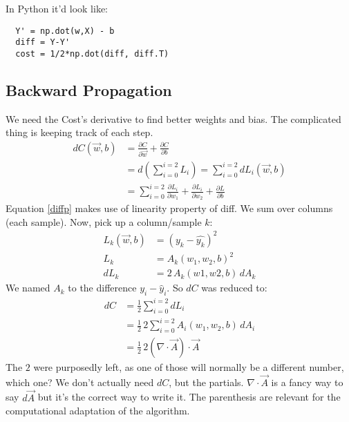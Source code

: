In Python it'd look like:
\begin{center}
  \begin{BVerbatim}
  Y' = np.dot(w,X) - b
  diff = Y-Y' 
  cost = 1/2*np.dot(diff, diff.T)
  \end{BVerbatim}
\end{center}





\subsection{Backward Propagation}
We need the Cost's derivative to find better weights and bias. The complicated thing is keeping track of each step.
\begin{align}
  dC(\vec{w},b) &= \frac{\partial C}{\partial \vec{w}} + \frac{\partial C}{\partial b}\nonumber\\
  &= d(\sum_{i=0}^{i=2}L_i) = \sum_{i=0}^{i=2}dL_i(\vec{w},b) \label{diffp}\\
  &=\sum_{i=0}^{i=2} \frac{\partial L_i}{\partial w_1} +\frac{\partial L_i}{\partial w_2} + \frac{\partial L}{\partial b}\nonumber
\end{align}
Equation \ref{diffp} makes use of linearity property of diff. We sum over columns (each sample). Now, pick up a column/sample $k$:
\begin{align*}
  L_k(\vec{w},b) &= (y_k - \hat{y_k})^2\\
    L_k &= A_k(w_1, w_2, b)^2\\
    dL_k &= 2\,A_k(w1,w2,b)\,dA_k
\end{align*}
We named $A_k$ to the difference $y_i-\hat{y}_i$.
So $dC$ was reduced to:
\begin{align}
  dC &= \frac{1}{2}\sum_{i=0}^{i=2} dL_i\\
  &= \frac{1}{2}\,{}2\sum_{i=0}^{i=2}A_i(w_1, w_2, b)\,dA_i\\
  &= \frac{1}{2}\,{}2(\nabla\cdot\vec{A})\cdot{}\vec{A}
\end{align}
The $2$ were purposedly left, as one of those will normally be a different number, which one? We don't actually need $dC$, but the partials.
$\nabla\cdot\vec{A}$ is a fancy way to say $d\vec{A}$ but it's the correct way to write it. The parenthesis are relevant for the computational adaptation of the algorithm.

